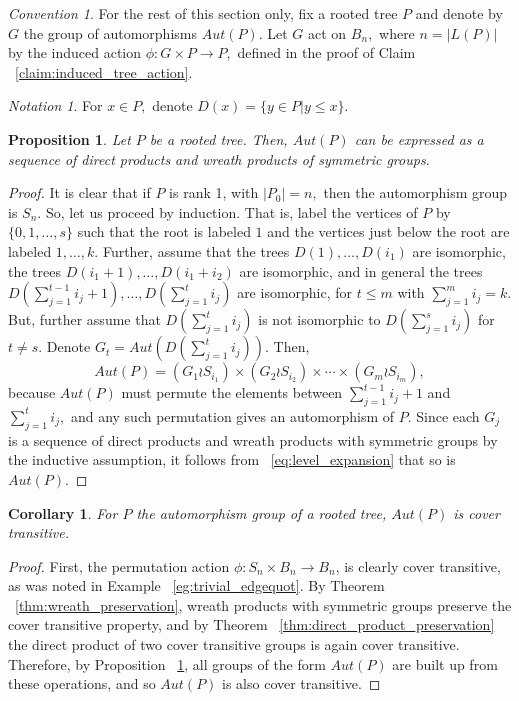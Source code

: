 \documentclass{amsart}
\newtheorem{cor}[thm]{Corollary}
\newtheorem{prop}[thm]{Proposition}
\theoremstyle{remark}
\newtheorem{note}[thm]{Notation}
\newtheorem{convention}[thm]{Convention}
\begin{document}
\begin{convention}
For the rest of this section only, fix a rooted tree $P$ and denote by $G$ the group of automorphisms $Aut(P).$ Let $G$ act on $B_n,$ where $n = |L(P)|$ by the induced action $\phi:G \times P \rightarrow P,$ defined in the proof of Claim ~\ref{claim:induced_tree_action}.
\end{convention}

\begin{note}
For $x \in P,$ denote $D(x) = \{y \in P| y \leq x\}.$
\end{note}
\begin{prop}
\label{prop:automorphism_trees}
Let $P$ be a rooted tree. Then, $Aut(P)$ can be expressed as a sequence of direct products and wreath products of symmetric groups.
\end{prop}

\begin{proof}
It is clear that if $P$ is rank 1, with $|P_0| = n,$ then the automorphism group is $S_n.$ So, let us proceed by induction. That is, label the vertices of $P$ by $\{0,1,\ldots, s\}$ such that the root is labeled $1$ and the vertices just below the root are labeled $1, \ldots, k.$ Further, assume that the trees $D(1),\ldots, D(i_1)$ are isomorphic, the trees $D(i_1+1),\ldots, D(i_1+i_2)$ are isomorphic, and in general the trees $D(\sum_{j=1}^{t-1}i_j+1),\ldots, D(\sum_{j=1}^{t}i_j)$ are isomorphic, for $t \leq m$ with $\sum_{j=1}^{m}i_j = k.$ But, further assume that $D(\sum_{j=1}^{t}i_j)$ is not isomorphic to $D(\sum_{j=1}^{s}i_j)$ for $t \neq s.$ Denote $G_t = Aut(D(\sum_{j=1}^{t}i_j)).$ Then, 
\begin{equation}
\label{eq:level_expansion}
Aut(P) = (G_1 \wr S_{i_1}) \times (G_2 \wr S_{i_2}) \times \cdots \times (G_m\wr S_{i_m}),
\end{equation}
because $Aut(P)$ must permute the elements between $\sum_{j=1}^{t-1}i_j+1$ and $\sum_{j=1}^{t}i_j,$ and any such permutation gives an automorphism of $P.$
Since each $G_j$ is a sequence of direct products and wreath products with symmetric groups by the inductive assumption, it follows from ~\eqref{eq:level_expansion} that so is $Aut(P).$
\end{proof}

\begin{cor}
For $P$ the automorphism group of a rooted tree, $Aut(P)$ is cover transitive.
\end{cor}
\begin{proof}
First, the permutation action $\phi:S_n \times B_n \rightarrow B_n$, is clearly cover transitive, as was noted in Example ~\ref{eg:trivial_edgequot}. By Theorem ~\ref{thm:wreath_preservation}, wreath products with symmetric groups preserve the cover transitive property, and by Theorem ~\ref{thm:direct_product_preservation} the direct product of two cover transitive groups is again cover transitive. Therefore, by Proposition ~\ref{prop:automorphism_trees}, all groups of the form $Aut(P)$ are built up from these operations, and so $Aut(P)$ is also cover transitive.
\end{proof}
\end{document}

